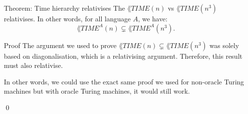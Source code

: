 \documentclass[a4paper]{article}
\begin{document}
\begin{parag}{Theorem: Time hierarchy relativises}
    The $\lang{TIME}\left(n\right)$ vs $\lang{TIME}\left(n^3\right)$ relativises. In other words, for all language $A$, we have: 
    \[\lang{TIME}^A\left(n\right) \subsetneq \lang{TIME}^A\left(n^3\right).\]
    
    \begin{subparag}{Proof}
        The argument we used to prove $\lang{TIME}\left(n\right) \subsetneq \lang{TIME}\left(n^3\right)$ was solely based on diagonalisation, which is a relativising argument. Therefore, this result must also relativise.

        In other words, we could use the exact same proof we used for non-oracle Turing machines but with oracle Turing machines, it would still work.

        \qed
    \end{subparag}
\end{parag}
\end{document}
